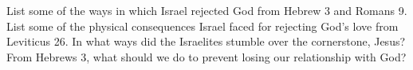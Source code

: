 \begin{questions}
\q List some of the ways in which Israel rejected God from Hebrew 3 and Romans 9.
\q List some of the physical consequences Israel faced for rejecting God's love from Leviticus 26.
\q In what ways did the Israelites stumble over the cornerstone, Jesus?
\q From Hebrews 3, what should we do to prevent losing our relationship with God?
\end{questions}